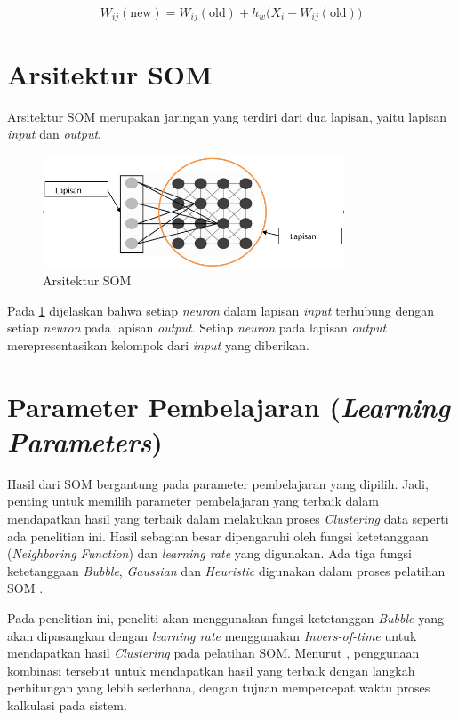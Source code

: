 \[
W_{ij}(\text{new}) = W_{ij}(\text{old}) + h_w \big( X_i - W_{ij}(\text{old}) \big)
\]

\section{Arsitektur SOM}

Arsitektur SOM merupakan jaringan yang terdiri dari dua lapisan, yaitu lapisan \textit{input} dan \textit{output}.

\begin{figure}[h]
	\centering
	\includegraphics[width=0.8\textwidth]{Gambar/arsitektursom}
	\caption{Arsitektur SOM}
	\label{fig:g3}
\end{figure}

Pada \ref{fig:g3} dijelaskan bahwa setiap \textit{neuron} dalam lapisan \textit{input} terhubung dengan setiap \textit{neuron} pada lapisan \textit{output}. Setiap \textit{neuron} pada lapisan \textit{output} merepresentasikan kelompok dari \textit{input} yang diberikan.

\section{Parameter Pembelajaran (\textit{Learning Parameters})}

Hasil dari SOM bergantung pada parameter pembelajaran yang dipilih. Jadi, penting untuk memilih parameter pembelajaran yang terbaik dalam mendapatkan hasil yang terbaik dalam melakukan proses \textit{Clustering} data seperti ada penelitian ini. Hasil sebagian besar dipengaruhi oleh fungsi ketetanggaan (\textit{Neighboring Function}) dan \textit{learning rate} yang digunakan. Ada tiga fungsi ketetanggaan \textit{Bubble}, \textit{Gaussian} dan \textit{Heuristic} digunakan dalam proses pelatihan SOM \citep{StefanovicKurasova2014a}.

Pada penelitian ini, peneliti akan menggunakan fungsi ketetanggan \textit{Bubble} yang akan dipasangkan dengan \textit{learning rate} menggunakan \textit{Invers-of-time} untuk mendapatkan hasil \textit{Clustering} pada pelatihan SOM. Menurut \citep{StefanovicKurasova2014a}, penggunaan kombinasi tersebut untuk mendapatkan hasil yang terbaik dengan langkah perhitungan yang lebih sederhana, dengan tujuan mempercepat waktu proses kalkulasi pada sistem.

